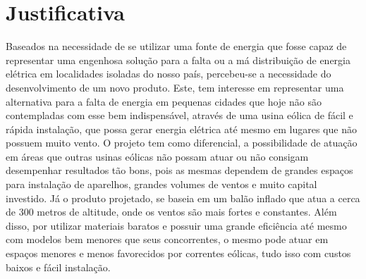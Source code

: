 \chapter*[Justificativa]{Justificativa}

Baseados na necessidade de se utilizar uma fonte de energia  que fosse capaz de representar uma engenhosa solução para a falta ou a má distribuição de energia elétrica em localidades isoladas do nosso país, percebeu-se a necessidade do desenvolvimento de um novo produto. Este, tem interesse em representar uma alternativa para a falta de energia em pequenas cidades que hoje não são contempladas com esse bem indispensável, através de uma usina eólica de fácil e rápida instalação, que possa gerar energia elétrica até mesmo em lugares que não possuem muito vento.
O projeto tem como diferencial, a possibilidade de atuação em áreas que outras usinas eólicas não possam atuar ou não consigam desempenhar resultados tão bons, pois as mesmas dependem de grandes espaços para instalação de aparelhos, grandes volumes de ventos e muito capital investido. Já o produto projetado, se baseia em um balão inflado que atua a cerca de 300 metros de altitude, onde os ventos são mais fortes e constantes. Além disso, por utilizar materiais baratos e possuir uma grande eficiência até mesmo com modelos bem menores que seus concorrentes, o mesmo pode atuar em espaços menores e menos favorecidos por correntes eólicas, tudo isso com custos baixos e fácil instalação.